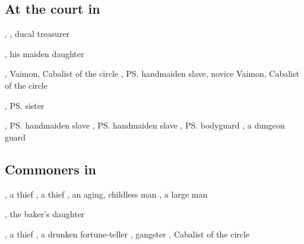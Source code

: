 \subsection{At the court in \Malcur}
\begin{dramatispersonae}
  , 
      
  , 
    ducal treasurer
  \begin{subdramatispersonae}
    , his maiden daughter
  \end{subdramatispersonae}
  , 
    Vaimon, 
    Cabalist of the \charcoalcircle{} circle
  , 
    \ps{\Tiroco}{} handmaiden slave, 
    novice Vaimon, 
    Cabalist of the \needlecircle{} circle
  \begin{subdramatispersonae}
    , 
      \ps{\Piacet}{} sister 
  \end{subdramatispersonae}
  , 
    \ps{\Tiroco}{} handmaiden slave 
  , 
    \ps{\Tiroco}{} handmaiden slave 
  , \ps{\Tiroco}{} bodyguard
  , a dungeon guard
\end{dramatispersonae}

\subsection{Commoners in \Malcur}
\begin{dramatispersonae}
  , a thief
  , a thief
  , 
    an aging, childless man
  , a large man
  \begin{subdramatispersonae}
    , the baker's daughter
  \end{subdramatispersonae}
  , a thief
  \dramitem[Uswa]{\Uswa}{\meccaran}{\female}, a drunken fortune-teller
  ,  gangster
  , 
    Cabalist of the \briarcircle{} circle
\end{dramatispersonae}

